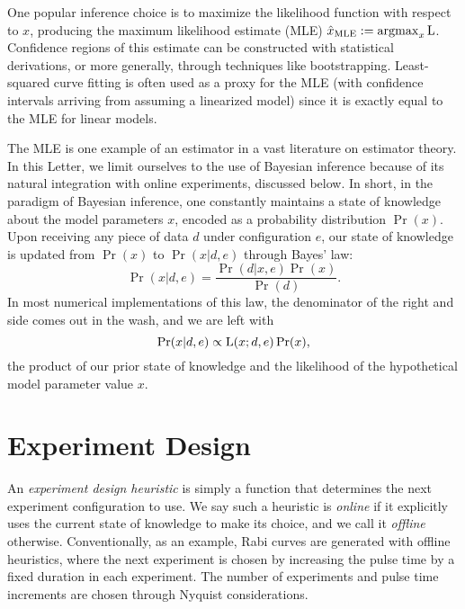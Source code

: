 \documentclass[aps,nofootinbib,prl,twocolumn,superscriptaddress]{revtex4}
\newcommand{\mps}{x}
\newcommand{\eps}{e}
\newcommand{\data}{d}
\newcommand{\MLE}{\text{MLE}}
\begin{document}
One popular inference choice is to maximize the likelihood function
with respect to $\mps$, producing the maximum likelihood estimate (MLE) 
$\hat{\mps}_\MLE:=\operatorname{argmax}_\mps \Lhood$.
Confidence regions of this estimate can be constructed 
with statistical derivations, or more generally, through techniques like bootstrapping.
Least-squared curve fitting is often used as a proxy for the MLE (with 
confidence intervals arriving from assuming
a linearized model) since it is exactly equal to the MLE
for linear models.

The MLE is one example of an estimator in a vast literature on estimator theory.
In this Letter, we limit ourselves to the use of Bayesian inference because of its
natural integration with online experiments, discussed below.
In short, in the paradigm of Bayesian inference, one constantly
maintains a state of knowledge about the model parameters $\mps$, encoded
as a probability distribution $\Pr(\mps)$.
Upon receiving any piece of data $\data$ under configuration $\eps$,
our state of knowledge is updated from $\Pr(\mps)$ to $\Pr(\mps|\data,\eps)$
through Bayes' law:
\begin{equation}
    \Pr(\mps|\data,\eps)
        = \frac{\Pr(\data|\mps,\eps)\Pr(\mps)}{\Pr(d)}.
\end{equation}
In most numerical implementations of this law, the denominator of the 
right and side comes out in the wash, and we are left with
\begin{equation}
    \Pr(\mps|\data,\eps)
        \propto \Lhood(\mps;\data,\eps)\Pr(\mps),
\end{equation}
the product of our prior state of knowledge and the likelihood
of the hypothetical model parameter value $\mps$.

\section{Experiment Design}
\label{sec:experiment-design}

An \textit{experiment design heuristic} is simply a function that 
determines the next experiment configuration to use.
We say such a heuristic is \textit{online} if it explicitly uses the current
state of knowledge to make its choice, and we call it \textit{offline} 
otherwise.
Conventionally, as an example, Rabi curves are generated 
with offline heuristics, where the next experiment is chosen by 
increasing the pulse time by a fixed duration in each experiment.
The number of experiments and pulse time increments are chosen through
Nyquist considerations.
\end{document}
